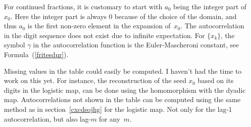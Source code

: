\documentclass[oneside,10pt]{book}
\begin{document}
For continued fractions, it is customary to start with $a_0$ being the integer part of $x_0$. Here the integer part is always $0$ because of the choice of the domain, and thus $a_0$ is the first non-zero element in the expansion of~$x_0$. The autocorrelation in the digit sequence does not exist due to infinite expectation. For $\{x_k\}$, the symbol $\gamma$ in the autocorrelation function is the Euler-Mascheroni constant,
 see Formula~(\ref{fritesdur}).

Missing values in the table could easily be computed. I haven't had the time to work on this yet. For instance,
 the reconstruction of the seed $x_0$ based on its digits in the logistic map, can be done using the homomorphism with the dyadic map.
 Autocorrelations not shown in the table can be computed using the same method as in section~\ref{cxcdsojhg} for the logistic map. Not only for the lag-1 autocorrelation, but also lag-$m$ for any~$m$.
\end{document}
